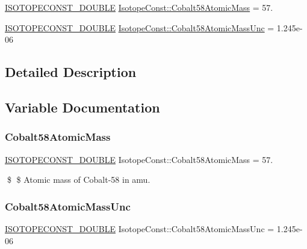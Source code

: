 \begin{DoxyCompactItemize}
\item 
\mbox{\hyperlink{group___isotope_const-_macros_ga8f45a7272ce02c0b4c65c44636ed719a}{I\+S\+O\+T\+O\+P\+E\+C\+O\+N\+S\+T\+\_\+\+D\+O\+U\+B\+LE}} \mbox{\hyperlink{group___isotope_const-_cobalt-_co58_gabb732f921d34035e41a25418bbde93a0}{Isotope\+Const\+::\+Cobalt58\+Atomic\+Mass}} = 57.
\item 
\mbox{\hyperlink{group___isotope_const-_macros_ga8f45a7272ce02c0b4c65c44636ed719a}{I\+S\+O\+T\+O\+P\+E\+C\+O\+N\+S\+T\+\_\+\+D\+O\+U\+B\+LE}} \mbox{\hyperlink{group___isotope_const-_cobalt-_co58_ga9ba9c976b34390400518b62909d3735d}{Isotope\+Const\+::\+Cobalt58\+Atomic\+Mass\+Unc}} = 1.\+245e-\/06
\end{DoxyCompactItemize}


\subsection{Detailed Description}


\subsection{Variable Documentation}
\mbox{\label{group___isotope_const-_cobalt-_co58_gabb732f921d34035e41a25418bbde93a0}} 
\subsubsection{\texorpdfstring{Cobalt58\+Atomic\+Mass}{Cobalt58AtomicMass}}
{\footnotesize\ttfamily \mbox{\hyperlink{group___isotope_const-_macros_ga8f45a7272ce02c0b4c65c44636ed719a}{I\+S\+O\+T\+O\+P\+E\+C\+O\+N\+S\+T\+\_\+\+D\+O\+U\+B\+LE}} Isotope\+Const\+::\+Cobalt58\+Atomic\+Mass = 57.}

\$ \$ Atomic mass of Cobalt-\/58 in amu. \mbox{\label{group___isotope_const-_cobalt-_co58_ga9ba9c976b34390400518b62909d3735d}} 
\subsubsection{\texorpdfstring{Cobalt58\+Atomic\+Mass\+Unc}{Cobalt58AtomicMassUnc}}
{\footnotesize\ttfamily \mbox{\hyperlink{group___isotope_const-_macros_ga8f45a7272ce02c0b4c65c44636ed719a}{I\+S\+O\+T\+O\+P\+E\+C\+O\+N\+S\+T\+\_\+\+D\+O\+U\+B\+LE}} Isotope\+Const\+::\+Cobalt58\+Atomic\+Mass\+Unc = 1.\+245e-\/06}

